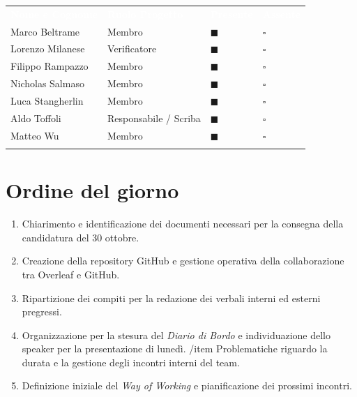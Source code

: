 \documentclass[12pt,a4paper]{article}
\newcommand{\tightlist}{\setlength{\itemsep}{1pt}\setlength{\parskip}{0pt}}
\begin{document}
\begin{center}
\begin{tabularx}{\linewidth}{>{\raggedright\arraybackslash}X>{\centering\arraybackslash}X>{\centering\arraybackslash}p{2.2cm}>{\centering\arraybackslash}p{2.2cm}}
\rowcolor{bfblue}\textcolor{white}{\textbf{Nome e Cognome}} & \textcolor{white}{\textbf{Ruolo Progetto}} & \textcolor{white}{\textbf{Presente}} & \textcolor{white}{\textbf{Assente}} \\
Marco Beltrame & Membro & $\blacksquare$ & $\square$ \\ \arrayrulecolor{bfline}\hline
Lorenzo Milanese & Verificatore & $\blacksquare$ & $\square$ \\ \arrayrulecolor{bfline}\hline
Filippo Rampazzo & Membro & $\blacksquare$ & $\square$ \\ \arrayrulecolor{bfline}\hline
Nicholas Salmaso & Membro & $\blacksquare$ & $\square$ \\ \arrayrulecolor{bfline}\hline
Luca Stangherlin & Membro & $\blacksquare$ & $\square$ \\ \arrayrulecolor{bfline}\hline
Aldo Toffoli & Responsabile / Scriba & $\blacksquare$ & $\square$ \\ \arrayrulecolor{bfline}\hline
Matteo Wu & Membro & $\blacksquare$ & $\square$ \\ \arrayrulecolor{bfline}\hline
\end{tabularx}
\end{center}


\hypertarget{ordine-del-giorno}{%
\section{Ordine del giorno}}

\begin{enumerate}
\tightlist
\item Chiarimento e identificazione dei documenti necessari per la consegna della candidatura del 30 ottobre.
\item Creazione della repository GitHub e gestione operativa della collaborazione tra Overleaf e GitHub.
\item Ripartizione dei compiti per la redazione dei verbali interni ed esterni pregressi.
\item Organizzazione per la stesura del \emph{Diario di Bordo} e individuazione dello speaker per la presentazione di lunedì.
/item Problematiche riguardo la durata e la gestione degli incontri interni del team.
\item Definizione iniziale del \emph{Way of Working} e pianificazione dei prossimi incontri.
\end{enumerate}
\end{document}
